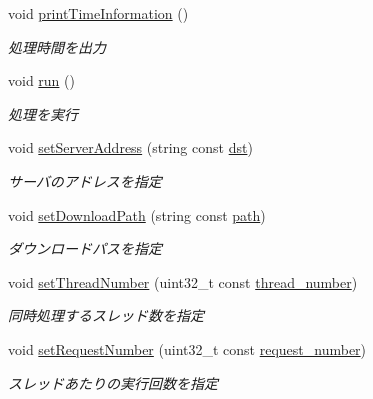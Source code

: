\begin{DoxyCompactItemize}
void \mbox{\hyperlink{class_session_a1b0a0eee5c4429fd148d796e6add79cd}{print\+Time\+Information}} ()
\begin{DoxyCompactList}\small\item\em 処理時間を出力 \end{DoxyCompactList}\item 
void \mbox{\hyperlink{class_session_a373987ee33c3e34612b56eb6f21bee42}{run}} ()
\begin{DoxyCompactList}\small\item\em 処理を実行 \end{DoxyCompactList}\item 
\mbox{\label{class_session_a28d4235ecf412be4a714610f9a37c54e}} 
void \mbox{\hyperlink{class_session_a28d4235ecf412be4a714610f9a37c54e}{set\+Server\+Address}} (string const \mbox{\hyperlink{class_session_a6d1ea15ced9736aa0ee7752300e430ea}{dst}})
\begin{DoxyCompactList}\small\item\em サーバのアドレスを指定 \end{DoxyCompactList}\item 
\mbox{\label{class_session_aacf1c816b90b02fd7a57984777a24de5}} 
void \mbox{\hyperlink{class_session_aacf1c816b90b02fd7a57984777a24de5}{set\+Download\+Path}} (string const \mbox{\hyperlink{class_session_ae26e301fcbf0c2d4717c3e9c28624fc7}{path}})
\begin{DoxyCompactList}\small\item\em ダウンロードパスを指定 \end{DoxyCompactList}\item 
\mbox{\label{class_session_ad4fb464f039e4b30914800d2dcc90051}} 
void \mbox{\hyperlink{class_session_ad4fb464f039e4b30914800d2dcc90051}{set\+Thread\+Number}} (uint32\+\_\+t const \mbox{\hyperlink{class_session_aef9ab24b7bf5b9323d126d2f87ae29c8}{thread\+\_\+number}})
\begin{DoxyCompactList}\small\item\em 同時処理するスレッド数を指定 \end{DoxyCompactList}\item 
void \mbox{\hyperlink{class_session_aebaba3b41feb88ff5ac38bccc9a59145}{set\+Request\+Number}} (uint32\+\_\+t const \mbox{\hyperlink{class_session_a8e0e6196c88d75c190fb38054fa02c53}{request\+\_\+number}})
\begin{DoxyCompactList}\small\item\em スレッドあたりの実行回数を指定 \end{DoxyCompactList}\item 

\end{DoxyCompactItemize}
